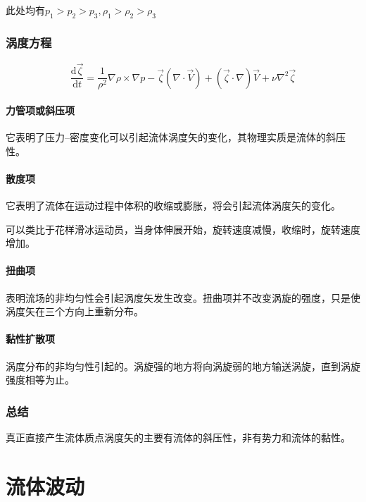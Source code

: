 \documentclass[a4paper,oneside]{ctexbook}
\begin{document}
此处均有\(p_1>p_2>p_3,\rho_1>\rho_2>\rho_3\)

\subsection{涡度方程}
\begin{equation}
    \dfrac{\mathrm{d}\overrightarrow{\zeta}}{\mathrm{d}t}=\dfrac{1}{\rho^2}\nabla\rho\times\nabla{p}-\overrightarrow{\zeta}(\nabla\cdot\overrightarrow{V})+(\overrightarrow{\zeta}\cdot\nabla)\overrightarrow{V}+\nu\nabla^2\overrightarrow{\zeta}
\end{equation}

\subsubsection{力管项或斜压项}

它表明了压力--密度变化可以引起流体涡度矢的变化，其物理实质是流体的斜压性。

\subsubsection{散度项}

它表明了流体在运动过程中体积的收缩或膨胀，将会引起流体涡度矢的变化。

可以类比于花样滑冰运动员，当身体伸展开始，旋转速度减慢，收缩时，旋转速度增加。

\subsubsection{扭曲项}

表明流场的非均匀性会引起涡度矢发生改变。扭曲项并不改变涡旋的强度，只是使涡度矢在三个方向上重新分布。

\subsubsection{黏性扩散项}

涡度分布的非均匀性引起的。涡旋强的地方将向涡旋弱的地方输送涡旋，直到涡旋强度相等为止。

\subsection{总结}

真正直接产生流体质点涡度矢的主要有流体的斜压性，非有势力和流体的黏性。

\chapter{流体波动}
\end{document}
